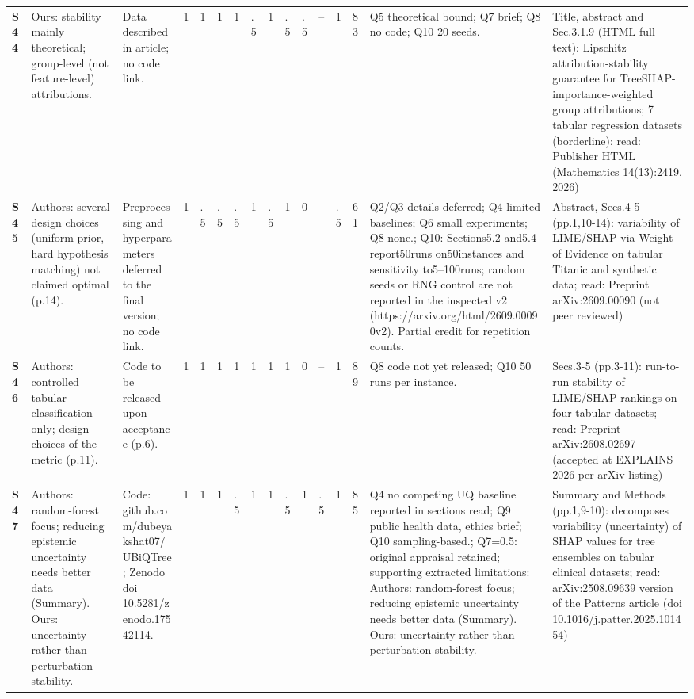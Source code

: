 \begin{longtable}{@{}P{1.0cm}P{4.6cm}P{3.6cm}P{0.3cm}P{0.3cm}P{0.3cm}P{0.3cm}P{0.3cm}P{0.3cm}P{0.3cm}P{0.3cm}P{0.3cm}P{0.36cm}P{0.75cm}P{3.0cm}P{3.9cm}@{}}
\textbf{S44} & Ours: stability mainly theoretical; group-level (not feature-level) attributions. & Data described in article; no code link. & 1 & 1 & 1 & 1 & .5 & 1 & .5 & .5 & -- & 1 & 83 & Q5 theoretical bound; Q7 brief; Q8 no code; Q10 20 seeds. & Title, abstract and Sec.3.1.9 (HTML full text): Lipschitz attribution-stability guarantee for TreeSHAP-importance-weighted group attributions; 7 tabular regression datasets (borderline); read: Publisher HTML (Mathematics 14(13):2419, 2026) \\
\textbf{S45} & Authors: several design choices (uniform prior, hard hypothesis matching) not claimed optimal (p.14). & Preprocessing and hyperparameters deferred to the final version; no code link. & 1 & .5 & .5 & .5 & 1 & .5 & 1 & 0 & -- & .5 & 61 & Q2/\allowbreak{}Q3 details deferred; Q4 limited baselines; Q6 small experiments; Q8 none.; Q10: Sections5.2 and5.4 report50runs on50instances and sensitivity to5--100runs; random seeds or RNG control are not reported in the inspected v2 (https:/\allowbreak{}/\allowbreak{}arxiv.org/\allowbreak{}html/\allowbreak{}2609.00090v2). Partial credit for repetition counts. & Abstract, Secs.4-5 (pp.1,10-14): variability of LIME/\allowbreak{}SHAP via Weight of Evidence on tabular Titanic and synthetic data; read: Preprint arXiv:2609.00090 (not peer reviewed) \\
\textbf{S46} & Authors: controlled tabular classification only; design choices of the metric (p.11). & Code to be released upon acceptance (p.6). & 1 & 1 & 1 & 1 & 1 & 1 & 1 & 0 & -- & 1 & 89 & Q8 code not yet released; Q10 50 runs per instance. & Secs.3-5 (pp.3-11): run-to-run stability of LIME/\allowbreak{}SHAP rankings on four tabular datasets; read: Preprint arXiv:2608.02697 (accepted at EXPLAINS 2026 per arXiv listing) \\
\textbf{S47} & Authors: random-forest focus; reducing epistemic uncertainty needs better data (Summary). Ours: uncertainty rather than perturbation stability. & Code: github.com/\allowbreak{}dubeyakshat07/\allowbreak{}UBiQTree; Zenodo doi 10.5281/\allowbreak{}zenodo.17542114. & 1 & 1 & 1 & .5 & 1 & 1 & .5 & 1 & .5 & 1 & 85 & Q4 no competing UQ baseline reported in sections read; Q9 public health data, ethics brief; Q10 sampling-based.; Q7=0.5: original appraisal retained; supporting extracted limitations: Authors: random-forest focus; reducing epistemic uncertainty needs better data (Summary). Ours: uncertainty rather than perturbation stability. & Summary and Methods (pp.1,9-10): decomposes variability (uncertainty) of SHAP values for tree ensembles on tabular clinical datasets; read: arXiv:2508.09639 version of the Patterns article (doi 10.1016/\allowbreak{}j.patter.2025.101454) \\

\end{longtable}
